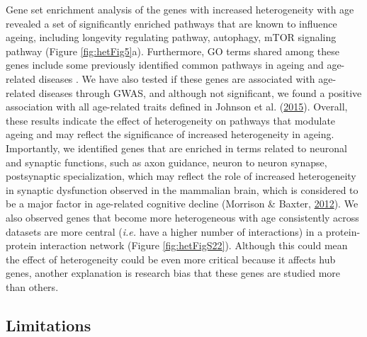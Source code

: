 \documentclass[12pt,twoside]{unicam}
\begin{document}
Gene set enrichment analysis of the genes with increased heterogeneity with age revealed a set of significantly enriched pathways that are known to influence ageing, including longevity regulating pathway, autophagy, mTOR signaling pathway (Figure \ref{fig:hetFig5}a). Furthermore, GO terms shared among these genes include some previously identified common pathways in ageing and age-related diseases
. We have also tested if these genes are associated with age-related diseases through GWAS, and although not significant, we found a positive association with all age-related traits defined in Johnson et al. (\protect\hyperlink{ref-Johnson2015}{2015}). Overall, these results indicate the effect of heterogeneity on pathways that modulate ageing and may reflect the significance of increased heterogeneity in ageing. Importantly, we identified genes that are enriched in terms related to neuronal and synaptic functions, such as axon guidance, neuron to neuron synapse, postsynaptic specialization, which may reflect the role of increased heterogeneity in synaptic dysfunction observed in the mammalian brain, which is considered to be a major factor in age-related cognitive decline (Morrison \& Baxter, \protect\hyperlink{ref-Morrison2012}{2012}). We also observed genes that become more heterogeneous with age consistently across datasets are more central (\emph{i.e.} have a higher number of interactions) in a protein-protein interaction network (Figure \ref{fig:hetFigS22}). Although this could mean the effect of heterogeneity could be even more critical because it affects hub genes, another explanation is research bias that these genes are studied more than others.

\hypertarget{limitations}{%
\subsection{Limitations}\label{limitations}}
\end{document}
